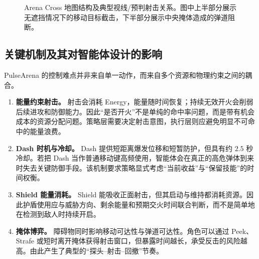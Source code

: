 \documentclass[UTF8,a4paper,11pt]{ctexart}
\begin{document}
\begin{figure}[H]
    \caption{Arena Cross 地图结构及典型视线/预判射击关系。图中上半部分展示无遮挡情况下的移动目标截击，下半部分展示中央掩体造成的弹道阻断。}
    \label{fig:arena_cross}
\end{figure}

\subsection{关键机制及其对智能体设计的影响}
PulseArena 的控制难点并非来自单一动作，而来自多个资源和物理约束之间的耦合。

\begin{enumerate}
    \item \textbf{能量约束射击。}
    射击会消耗 Energy，能量随时间恢复；持续无效开火会削弱后续进攻和防御能力。因此“是否开火”不是单纯的命中率问题，而是带有机会成本的资源分配问题。策略层需要决定射击意图，执行层则应避免明显不可命中的能量浪费。

    \item \textbf{Dash 时机与冷却。}
    Dash 提供短距离爆发位移和短暂防护，但具有约 $2.5$ 秒冷却。若把 Dash 当作普通移动键高频使用，智能体会在真正的高危弹体到来时失去关键防御手段。该机制要求策略显式考虑“当前收益”与“保留技能”的时间权衡。

    \item \textbf{Shield 能量消耗。}
    Shield 能吸收正面射击，但其启动与维持都消耗资源。因此护盾使用应与威胁方向、剩余能量和预期交火时间联合判断，而不是简单地在检测到敌人时持续开启。

    \item \textbf{掩体博弈。}
    障碍物同时影响移动可达性与弹道可达性。角色可以通过 Peek、Strafe 或短时离开掩体获得射击窗口，但暴露时间越长，承受反击的风险越高。由此产生了典型的“探头--射击--回撤”节奏。
\end{enumerate}
\end{document}
